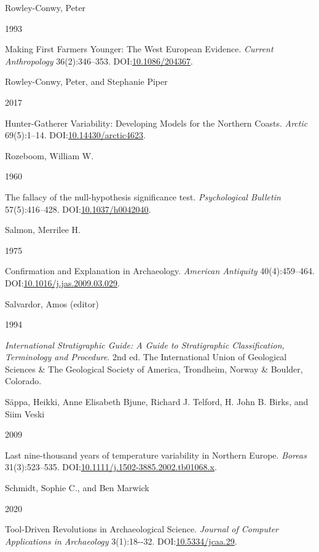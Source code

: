 \documentclass[
  12pt,
  a4paper,
  oneside]{book}
\newlength{\cslhangindent}
\newlength{\csllabelwidth}
\newlength{\cslentryspacingunit} %
\newenvironment{CSLReferences}[2] %
 {%
  \setlength{\parindent}{0pt}
  \ifodd #1
  \let\oldpar\par
  \def\par{\hangindent=\cslhangindent\oldpar}
  \fi
  \setlength{\parskip}{#2\cslentryspacingunit}
 }%
 {}
\newcommand{\CSLBlock}[1]{#1\hfill\break}
\newcommand{\CSLLeftMargin}[1]{\parbox[t]{\csllabelwidth}{#1}}
\newcommand{\CSLRightInline}[1]{\parbox[t]{\linewidth - \csllabelwidth}{#1}\break}
\begin{document}
\begin{CSLReferences}{0}{0}
\leavevmode{}%
\CSLBlock{Rowley-Conwy, Peter}
\CSLLeftMargin{ 1993}%
\CSLRightInline{{Making First Farmers Younger: The West European Evidence}. \emph{Current Anthropology} 36(2):346--353. DOI:\href{https://doi.org/10.1086/204367}{10.1086/204367}.}

\leavevmode{}%
\CSLBlock{Rowley-Conwy, Peter, and Stephanie Piper}
\CSLLeftMargin{ 2017}%
\CSLRightInline{{Hunter-Gatherer Variability: Developing Models for the Northern Coasts}. \emph{Arctic} 69(5):1--14. DOI:\href{https://doi.org/10.14430/arctic4623}{10.14430/arctic4623}.}

\leavevmode{}%
\CSLBlock{Rozeboom, William W.}
\CSLLeftMargin{ 1960}%
\CSLRightInline{The fallacy of the null-hypothesis significance test. \emph{Psychological Bulletin} 57(5):416--428. DOI:\href{https://doi.org/10.1037/h0042040}{10.1037/h0042040}.}

\leavevmode{}%
\CSLBlock{Salmon, Merrilee H.}
\CSLLeftMargin{ 1975}%
\CSLRightInline{{Confirmation and Explanation in Archaeology}. \emph{American Antiquity} 40(4):459--464. DOI:\href{https://doi.org/10.1016/j.jas.2009.03.029}{10.1016/j.jas.2009.03.029}.}

\leavevmode{}%
\CSLBlock{Salvardor, Amos (editor)}
\CSLLeftMargin{ 1994}%
\CSLRightInline{\emph{{International Stratigraphic Guide: A Guide to Stratigraphic Classification, Terminology and Procedure}}. 2nd ed. The International Union of Geological Sciences \& The Geological Society of America, Trondheim, Norway \& Boulder, Colorado.}

\leavevmode{}%
\CSLBlock{Säppa, Heikki, Anne Elisabeth Bjune, Richard J. Telford, H. John B. Birks, and Siim Veski}
\CSLLeftMargin{ 2009}%
\CSLRightInline{{Last nine-thousand years of temperature variability in Northern Europe}. \emph{Boreas} 31(3):523--535. DOI:\href{https://doi.org/10.1111/j.1502-3885.2002.tb01068.x}{10.1111/j.1502-3885.2002.tb01068.x}.}

\leavevmode{}%
\CSLBlock{Schmidt, Sophie C., and Ben Marwick}
\CSLLeftMargin{ 2020}%
\CSLRightInline{{Tool-Driven Revolutions in Archaeological Science}. \emph{Journal of Computer Applications in Archaeology} 3(1):18-\/-32. DOI:\href{https://doi.org/10.5334/jcaa.29}{10.5334/jcaa.29}.}


\end{CSLReferences}
\end{document}
